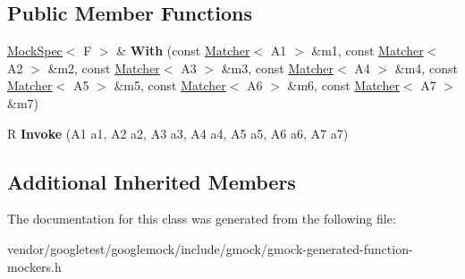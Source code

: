 \subsection*{Public Member Functions}
\begin{DoxyCompactItemize}
\item 
\mbox{\label{classtesting_1_1internal_1_1_function_mocker_3_01_r_07_a1_00_01_a2_00_01_a3_00_01_a4_00_01_a5_00_01_a6_00_01_a7_08_4_abaa600e7ae355a1579d1c02a4ea726fb}} 
\hyperlink{classtesting_1_1internal_1_1_mock_spec}{Mock\+Spec}$<$ F $>$ \& {\bfseries With} (const \hyperlink{classtesting_1_1_matcher}{Matcher}$<$ A1 $>$ \&m1, const \hyperlink{classtesting_1_1_matcher}{Matcher}$<$ A2 $>$ \&m2, const \hyperlink{classtesting_1_1_matcher}{Matcher}$<$ A3 $>$ \&m3, const \hyperlink{classtesting_1_1_matcher}{Matcher}$<$ A4 $>$ \&m4, const \hyperlink{classtesting_1_1_matcher}{Matcher}$<$ A5 $>$ \&m5, const \hyperlink{classtesting_1_1_matcher}{Matcher}$<$ A6 $>$ \&m6, const \hyperlink{classtesting_1_1_matcher}{Matcher}$<$ A7 $>$ \&m7)
\item 
\mbox{\label{classtesting_1_1internal_1_1_function_mocker_3_01_r_07_a1_00_01_a2_00_01_a3_00_01_a4_00_01_a5_00_01_a6_00_01_a7_08_4_a9088342f6d93448dba290e565c006979}} 
R {\bfseries Invoke} (A1 a1, A2 a2, A3 a3, A4 a4, A5 a5, A6 a6, A7 a7)
\end{DoxyCompactItemize}
\subsection*{Additional Inherited Members}


The documentation for this class was generated from the following file\+:\begin{DoxyCompactItemize}
\item 
vendor/googletest/googlemock/include/gmock/gmock-\/generated-\/function-\/mockers.\+h\end{DoxyCompactItemize}
